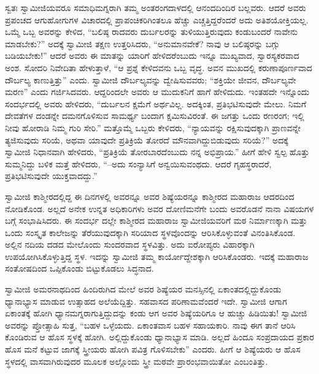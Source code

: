 ಸ್ವತಃ ಸ್ವಾಮೀಜಿಯವರೂ ಸಮಾಧಿಮಗ್ನರಾಗಿ ತಮ್ಮ ಅಂತರಂಗದಾಳದಲ್ಲಿ ಆನಂದದಿಂದಿರ ಬಲ್ಲವರು. ಆದರೆ ಅವರು ಪ್ರಪಂಚದ ಆಗುಹೋಗುಗಳ ವಿಚಾರದಲ್ಲಿ ಪ್ರಾಪಂಚಿಕರಿಗಿಂತಲೂ ಹೆಚ್ಚು ಎಚ್ಚತ್ತಿದ್ದರೆಂದರೆ ಅದು ಅತಿಶಯೋಕ್ತಿಯಲ್ಲ. ಒಮ್ಮೆ ಒಬ್ಬ ಅವರನ್ನು ಕೇಳಿದ, “ಬಲಿಷ್ಠ ರಾದವರು ದುರ್ಬಲರನ್ನು ತುಳಿಯುತ್ತಿರುವುದು ಕಂಡುಬಂದರೆ ನಾವೇನು ಮಾಡಬೇಕು?” ಅದಕ್ಕೆ ಸ್ವಾಮೀಜಿ ತಕ್ಷಣ ಉತ್ತರಿಸಿದರು, “ಅನುಮಾನವೇಕೆ? ನಾವು ಆ ಬಲಿಷ್ಠರನ್ನು ಬಗ್ಗು ಬಡಿಯಬೇಕು!” ಆದರೆ ಅವರು ಈ ಮಾತನ್ನು ಯಾರಿಗೆ ಹೇಳಿದರೆಂಬುದು ಇನ್ನೂ ಮುಖ್ಯವಾದ, ಸ್ವಾರಸ್ಯಕರವಾದ ಅಂಶ. ಸೋದರಿ ನಿವೇದಿತಾ ಹೇಳುತ್ತಾಳೆ, “ಆ ಪ್ರಶ್ನೆ ಕೇಳಿದವನು ಒಬ್ಬ ವೃದ್ಧ. ಅವನ ಮುಖದಲ್ಲಿ ಕರುಣಾಪೂರ್ಣವಾದ ದೌರ್ಬಲ್ಯ ಕಾಣುತ್ತಿತ್ತು” ಎಂದು. ಸ್ವಾಮೀಜಿ ದೌರ್ಬಲ್ಯವನ್ನು ದ್ವೇಷಿಸುವವರು; “ಶಕ್ತಿಯೇ ಜೀವನ, ದೌರ್ಬಲ್ಯವೇ ಮರಣ” ಎಂದು ಗರ್ಜಿಸಿದವರು. ಆದ್ದರಿಂದಲೇ ಅವರು ಆ ಮುದುಕನಿಗೆ ಹಾಗೆ ಹೇಳಿದುದು. ಇಂತಹದೇ ಇನ್ನೊಂದು ಸಂದರ್ಭದಲ್ಲಿ ಅವರು ಹೇಳಿದರು, “ದುರ್ಬಲನ ಕ್ಷಮೆಗೆ ಅರ್ಥವಿಲ್ಲ. ಅದಕ್ಕಿಂತ, ಪ್ರತಿಭಟಿಸುವುದೇ ಮೇಲು. ನಿಮಗೆ ದೇವತೆಗಳ ದಂಡನ್ನೇ ದಮನಗೊಳಿಸುವ ಸಾಮರ್ಥ್ಯ ಬಂದಾಗ ಕ್ಷಮಿಸುವಿರಂತೆ. ಈ ಜಗತ್ತು ಒಂದು ರಣರಂಗ; ಇಲ್ಲಿ ನೀವು ಹೋರಾಡಿ ನಿಮ್ಮ ಗುರಿ ಸೇರಿ.” ಮತ್ತೊಮ್ಮೆ ಒಬ್ಬರು ಕೇಳಿದರು, “ನ್ಯಾಯವನ್ನು ರಕ್ಷಿಸುವುದಕ್ಕಾಗಿ ಪ್ರಾಣವನ್ನೇ ತ್ಯಜಿಸುವುದು ಸರಿಯೆ, ಅಥವಾ ಯಾವುದೇ ಪ್ರತಿಕ್ರಿಯೆ ತೋರದೆ ಮೌನವಾಗಿದ್ದುಬಿಡುವುದು ಸರಿಯೆ?” ಅದಕ್ಕೆ ಸ್ವಾಮೀಜಿ ನಿಧಾನವಾಗಿ ಹೇಳಿದರು, “ಪ್ರತಿಕ್ರಿಯೆ ತೋರಬಾರದೆಂಬುದು ನನ್ನ ಅಭಿಪ್ರಾಯ.” ಹೀಗೆ ಹೇಳಿ ಸ್ವಲ್ಪ ಹೊತ್ತು ಸುಮ್ಮನಿದ್ದು ಬಳಿಕ ಮತ್ತೆ ಹೇಳಿದರು, “–ಅದು ಸಂನ್ಯಾಸಿಗೆ ಅನ್ವಯಿಸುವಂಥದು. ಆದರೆ ಗೃಹಸ್ಥರಾದರೆ, ಪ್ರತಿಭಟಿಸುವುದೇ ಯುಕ್ತವಾದದ್ದು.”

ಸ್ವಾಮೀಜಿ ಕಾಶ್ಮೀರದಲ್ಲಿದ್ದ ಈ ದಿನಗಳಲ್ಲಿ ಅವರನ್ನೂ ಅವರ ಶಿಷ್ಯೆಯರನ್ನೂ ಕಾಶ್ಮೀರದ ಮಹಾರಾಜ ಆದರದಿಂದ ನೋಡಿಕೊಂಡ. ಅಲ್ಲದೆ ಅನೇಕ ಉನ್ನತ ಅಧಿಕಾರಿಗಳು ಅವರ ದೋಣಿಮನೆಗೇ ಬಂದು ಅವರೊಡನೆ ನಾನಾ ವಿಷಯಗಳ ಬಗ್ಗೆ ಸಂಭಾಷಿಸಿದರು. ಈ ಸಂದರ್ಭ ದಲ್ಲೇ ಕಾಶ್ಮೀರದ ಮಹಾರಾಜ ಸ್ವಾಮೀಜಿಯವರಿಗೆ ಮಠ ನಿರ್ಮಾಣಕ್ಕಾಗಿ ಮತ್ತು ಒಂದು ಸಂಸ್ಕೃತ ಕಾಲೇಜನ್ನು ತೆರೆಯುವುದಕ್ಕಾಗಿ ಸರಿಯಾದ ಸ್ಥಳವೊಂದನ್ನು ಆರಿಸಿಕೊಳ್ಳುವಂತೆ ವಿನಂತಿಸಿಕೊಂಡ. ಅಲ್ಲಿನ ನದಿಯ ದಡದ ಮೇಲೊಂದು ಸುಂದರವಾದ ಸ್ಥಳವಿತ್ತು. ಅದು ಐರೋಪ್ಯರು ವಿಹಾರಕ್ಕಾಗಿ ಉಪಯೋಗಿಸಿಕೊಳ್ಳುತ್ತಿದ್ದ ಸ್ಥಳ. ಇದನ್ನು ಸ್ವಾಮೀಜಿ ತಮ್ಮ ಕಾರ್ಯೋದ್ದೇಶಕ್ಕಾಗಿ ಆರಿಸಿಕೊಂಡರು. ಇದಕ್ಕೆ ಮಹಾರಾಜ ಸಂತೋಷದಿಂದ ಒಪ್ಪಿಕೊಂಡು ಬಿಟ್ಟುಕೊಡಲು ಸಿದ್ಧನಾದ.

ಸ್ವಾಮೀಜಿ ಅಮರನಾಥದಿಂದ ಹಿಂದಿರುಗಿದ ಮೇಲೆ ಅವರ ಶಿಷ್ಯೆಯರ ಮನಸ್ಸಿನಲ್ಲಿ ಏಕಾಂತದಲ್ಲಿದ್ದುಕೊಂಡು ಧ್ಯಾನಾಭ್ಯಾಸ ಮಾಡುವ ಉತ್ಸಾಹದ ಅಲೆಯೆದ್ದಿತ್ತು. ಸಹವಾಸದ ಪರಿಣಾಮವೆಂದರೆ ಇದೇ. ಸ್ವಾಮೀಜಿ ಆಗಾಗ ಏಕಾಂತಕ್ಕೆ ಹೋಗಿ ಧ್ಯಾನಮಗ್ನರಾಗುತ್ತಿದ್ದುದನ್ನು ಕಂಡು ಆಗ ಅವರ ಶಿಷ್ಯೆಯರಿಗೂ ಆ ಹುಚ್ಚು ಹಿಡಿಯಿತು! ಸ್ವಾಮೀಜಿ ಅವರನ್ನು ಪ್ತೋತ್ಸಾಹಿ ಸುತ್ತ, “ಬಹಳ ಒಳ್ಳೆಯದು. ಏಕಾಂತವಾಸ ಬಹಳ ಸಹಾಯಕಾರಿ. ನಾವು ಈಗ ತಾನೆ ಆರಿಸಿ ಕೊಂಡಿರುವ ಆ ಹೊಸ ಸ್ಥಳಕ್ಕೆ ಹೋಗಿ. ಅಲ್ಲಿದ್ದುಕೊಂಡು ಧ್ಯಾನಾಭ್ಯಾಸ ಮಾಡಿ. ಅಲ್ಲದೆ ಹಿಂದೂ ಸಂಪ್ರದಾಯದ ಪ್ರಕಾರ ಹೊಸ ಮನೆ ಕಟ್ಟುವ ಜಾಗಕ್ಕೆ ಸ್ತ್ರೀಯರು ಹೋಗಿ ಪವಿತ್ರ ಗೊಳಿಸಬೇಕು” ಎಂದರು. ಹೀಗೆ ಆ ಶಿಷ್ಯೆಯರು ಆ ಹೊಸ ಸ್ಥಳದಲ್ಲಿ ವಾಸವಾಗಿರುವುದರ ಮೂಲಕ ಅಲ್ಲೊಂದು ಸ್ತ್ರೀ ಮಠವೇ ಪ್ರಾರಂಭವಾಯಿತೋ ಎಂಬಂತಿತ್ತು.


